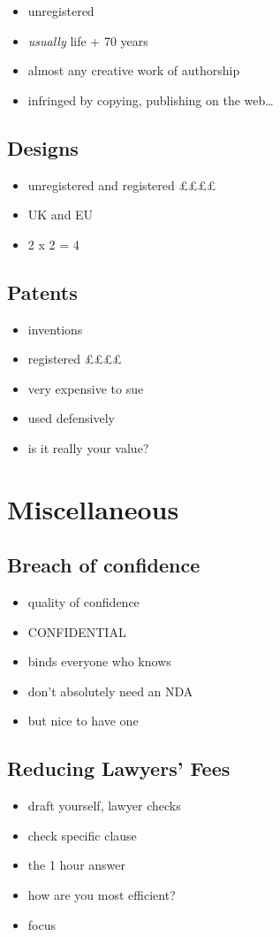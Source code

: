 \begin{itemize}
\itemsep1pt\parskip0pt
\item
  unregistered
\item
  \emph{usually} life + 70 years
\item
  almost any creative work of authorship
\item
  infringed by copying, publishing on the web\ldots{}
\end{itemize}

\subsection{Designs}\label{designs}

\begin{itemize}
\itemsep1pt\parskip0pt
\item
  unregistered and registered ££££
\item
  UK and EU
\item
  2 x 2 = 4
\end{itemize}

\subsection{Patents}\label{patents}

\begin{itemize}
\itemsep1pt\parskip0pt
\item
  inventions
\item
  registered ££££
\item
  very expensive to sue
\item
  used defensively
\item
  is it really your value?
\end{itemize}

\section{Miscellaneous}\label{miscellaneous}

\subsection{Breach of confidence}\label{breach-of-confidence}

\begin{itemize}
\itemsep1pt\parskip0pt
\item
  quality of confidence
\item
  CONFIDENTIAL
\item
  binds everyone who knows
\item
  don't absolutely need an NDA
\item
  but nice to have one
\end{itemize}

\subsection{Reducing Lawyers' Fees}\label{reducing-lawyers-fees}

\begin{itemize}
\itemsep1pt\parskip0pt
\item
  draft yourself, lawyer checks
\item
  check specific clause
\item
  the 1 hour answer
\item
  how are you most efficient?
\item
  focus
\end{itemize}
